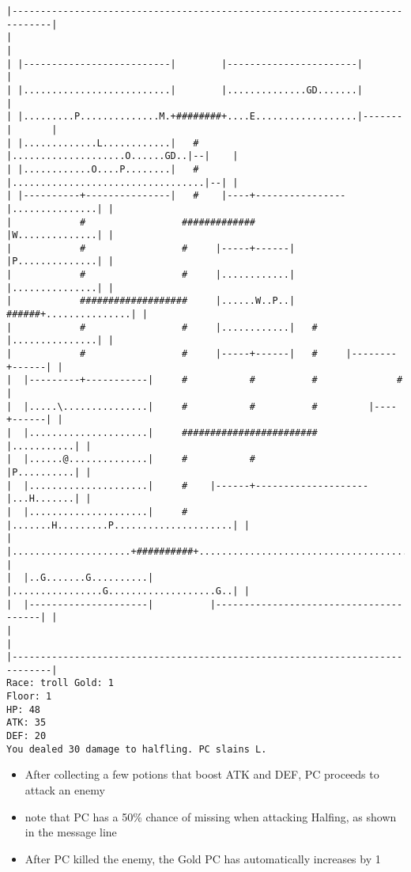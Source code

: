 \documentclass[11pt]{article}
\theoremstyle{plain}
\begin{document}
\begin{Verbatim}[fontsize=\small]
|-----------------------------------------------------------------------------|
|                                                                             |
| |--------------------------|        |-----------------------|               |
| |..........................|        |..............GD.......|               |
| |.........P..............M.+########+....E..................|-------|       |
| |.............L............|   #    |....................O......GD..|--|    |
| |............O....P........|   #    |..................................|--| |
| |----------+---------------|   #    |----+----------------|...............| |
|            #                 #############                |W..............| |
|            #                 #     |-----+------|         |P..............| |
|            #                 #     |............|         |...............| |
|            ###################     |......W..P..|   ######+...............| |
|            #                 #     |............|   #     |...............| |
|            #                 #     |-----+------|   #     |--------+------| |
|  |---------+-----------|     #           #          #              #        |
|  |.....\...............|     #           #          #         |----+------| |
|  |.....................|     ########################         |...........| |
|  |......@..............|     #           #                    |P..........| |
|  |.....................|     #    |------+--------------------|...H.......| |
|  |.....................|     #    |.......H.........P.....................| |
|  |.....................+##########+.......................................| |
|  |..G.......G..........|          |................G...................G..| |
|  |---------------------|          |---------------------------------------| |
|                                                                             |
|-----------------------------------------------------------------------------|
Race: troll Gold: 1                                                    Floor: 1
HP: 48
ATK: 35
DEF: 20
You dealed 30 damage to halfling. PC slains L.
\end{Verbatim}

\begin{itemize}
    \item After collecting a few potions that boost ATK and DEF, PC
          proceeds to attack an enemy
    \item note that PC has a 50\% chance of missing when attacking Halfing,
          as shown in the message line
    \item After PC killed the enemy, the Gold PC has automatically increases by 1
\end{itemize}
\end{document}
